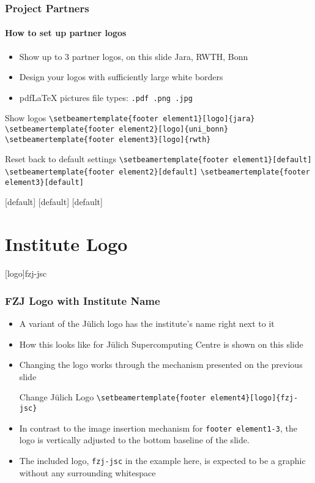 \begin{frame}[fragile]
        \frametitle{Project Partners}
        \framesubtitle{How to set up partner logos}
        \begin{itemize}
      \item Show up to 3 partner logos, on this slide Jara, RWTH, Bonn
      \item Design your logos with sufficiently large white borders
      \item {pdf\LaTeX} pictures file types: \verb+.pdf .png .jpg+
    \end{itemize}
        \begin{block}{Show logos}
        \verb+\setbeamertemplate{footer element1}[logo]{jara}+
                \verb+\setbeamertemplate{footer element2}[logo]{uni_bonn}+
        \verb+\setbeamertemplate{footer element3}[logo]{rwth}+
    \end{block}
        \begin{block}{Reset back to default settings}
        \verb+\setbeamertemplate{footer element1}[default]+
        \verb+\setbeamertemplate{footer element2}[default]+
        \verb+\setbeamertemplate{footer element3}[default]+
    \end{block}
\end{frame}
[default]
[default]
[default]


\section{Institute Logo}

{[logo]{fzj-jsc}
\begin{frame}[fragile]
    \frametitle{FZJ Logo with Institute Name}
    \begin{itemize}
        \item A variant of the Jülich logo has the institute's name right next to it
        \item How this looks like for Jülich Supercomputing Centre is shown on this slide
        \item Changing the logo works through the mechanism presented on the previous slide
        \begin{block}{Change Jülich Logo}
            \verb+\setbeamertemplate{footer element4}[logo]{fzj-jsc}+
        \end{block}
        \item In contrast to the image insertion mechanism for \verb+footer element1-3+, the logo is vertically adjusted to the bottom baseline of the slide.
        \item The included logo, \verb+fzj-jsc+ in the example here, is expected to be a graphic without any surrounding whitespace
    \end{itemize}
\end{frame}
}%

